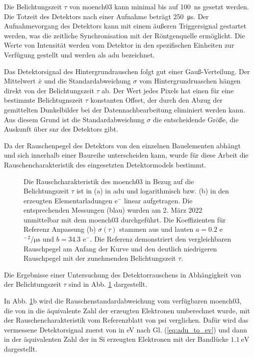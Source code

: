 \noindent
Die Belichtungszeit $\tau$ von \gls{moench03} kann minimal bis auf \SI{100}{\nano\second} gesetzt werden. Die Totzeit des Detektors nach einer Aufnahme beträgt \SI{250}{\micro\second}. Der Aufnahmevorgang des Detektors kann mit einem äußeren Triggersignal gestartet werden, was die zeitliche Synchronisation mit der Röntgenquelle ermöglicht. Die Werte von Intensität werden vom Detektor in den spezifischen Einheiten zur Verfügung gestellt und werden als \gls{adu} bezeichnet.

\noindent
Das Detektorsignal des Hintergrundrauschen folgt gut einer Gauß-Verteilung. Der Mittelwert $\bar{x}$ und die Standardabweichung $\sigma$ vom Hintergrundruaschen hängen direkt von der Belichtungszeit $\tau$ ab. Der Wert jedes Pixels hat einen für eine bestimmte Belichtugnszeit $\tau$ konstanten Offset, der durch den Abzug der gemittelten Dunkelbilder bei der Datennachbearbeitung eliminiert werden kann. Aus diesem Grund ist die Standardabweichung $\sigma$ die entscheidende Größe, die Auskunft über \gls{snr} des Detektors gibt.

\noindent
Da der Rauschenpegel des Detektors von den einzelnen Bauelementen abhängt und sich innerhalb einer Baureihe unterscheiden kann, wurde für diese Arbeit die  Rauschencharakteristik des eingesetzten Detektormodels bestimmt.
\begin{figure}[H]
    \centering
    
    \caption{Die Rauschcharakteristik des \gls{moench03} in Bezug auf die Belichtungszeit $\tau$ ist in (a) in \gls{adu} und logarithmisch bzw. (b) in den erzeugten Elementarladungen e$^-$ linear aufgetragen. Die entsprechenden Messungen (blau) wurden am 2. März 2022 unmittelbar mit dem \gls{moench03} durchgeführt. Die Koeffizienten für Referenz Anpassung (b) $\sigma(\tau)$ stammen aus \cite{ramilli-measurements-2017} und lauten $a=\num{0,2}$ e${^-}^2\si{\per\micro\second}$ und $b=\num{34.3}$ e${^-}$. Die Referenz demonstriert den vergleichbaren Rauschpegel am Anfang der Kurve und den deutlich niedrigeren Rauschpegel mit der zunehmenden Belichtungszeit $\tau$.}
    \label{fig:noise_moench}
\end{figure}
\noindent
Die Ergebnisse einer Untersuchung des Detektorrauschens in Abhängigkeit von der Belichtungszeit $\tau$ sind in Abb. \ref{fig:noise_moench} dargestellt.

\noindent
In Abb. \ref{fig:noise_moench}b wird die Rauschenstandardabweichung vom verfügbaren \gls{moench03}, die von \si{\adu} in die äquivalente Zahl der erzeugten Elektronen umberechnet wurde, mit der Rauschencharakteristik vom Referenzblatt \cite{ramilli-measurements-2017} von \gls{psi} verglichen. Dafür wird das vermessene Detektorsignal zuerst von \si{\adu} in \si{\eV} nach Gl. (\ref{eq:adu_to_ev}) und dann in der äquivalenten Zahl der in Si erzeugten Elektronen mit der Bandlücke $\SI{1,1}{\eV}$ dargestellt.

